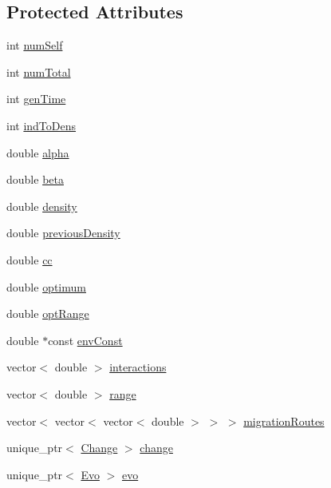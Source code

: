 \subsection*{Protected Attributes}
\begin{DoxyCompactItemize}
\item 
int \hyperlink{classSpecies_a11e7aac3c4a85723e8a9d00d00452508}{num\+Self}
\item 
int \hyperlink{classSpecies_af13ccb1fc01cff22d7a47201c1002fbc}{num\+Total}
\item 
int \hyperlink{classSpecies_a17c9e5d56923d9800bd9b2cfacbcba8b}{gen\+Time}
\item 
int \hyperlink{classSpecies_a3a11f42cb341349dadb706fff06f301d}{ind\+To\+Dens}
\item 
double \hyperlink{classSpecies_a28a22a5a1eef97867bd6e5d7db2c0c6a}{alpha}
\item 
double \hyperlink{classSpecies_ae4f30dc0bf280e80601fc39a0150f8f2}{beta}
\item 
double \hyperlink{classSpecies_a2d5f0b6b799578963257416fa5ad0630}{density}
\item 
double \hyperlink{classSpecies_a46b0370ca3501bdcec53545df9f44cf4}{previous\+Density}
\item 
double \hyperlink{classSpecies_afbf0d05fd5e3904c1ce62833942ef935}{cc}
\item 
double \hyperlink{classSpecies_a234d375e63c9be61d756b7e70d7d9397}{optimum}
\item 
double \hyperlink{classSpecies_ab7103281892ef74944f3f10df5ecbe69}{opt\+Range}
\item 
double $\ast$const \hyperlink{classSpecies_a95c7dd87e88653b245d52400b4134b68}{env\+Const}
\item 
vector$<$ double $>$ \hyperlink{classSpecies_a2ea9ab3b36448426b237f40dd4a1a18d}{interactions}
\item 
vector$<$ double $>$ \hyperlink{classSpecies_af95c9259381c434919dd4e9041a65bc7}{range}
\item 
vector$<$ vector$<$ vector$<$ double $>$ $>$ $>$ \hyperlink{classSpecies_a732dd85466e7156e8e51c7b44ea00f24}{migration\+Routes}
\item 
unique\+\_\+ptr$<$ \hyperlink{classChange}{Change} $>$ \hyperlink{classSpecies_a6517dbf3b05112b50baadc9479856dda}{change}
\item 
unique\+\_\+ptr$<$ \hyperlink{classEvo}{Evo} $>$ \hyperlink{classSpecies_a25d6cad0391b8d98c986e17bcb5c2586}{evo}
\end{DoxyCompactItemize}


